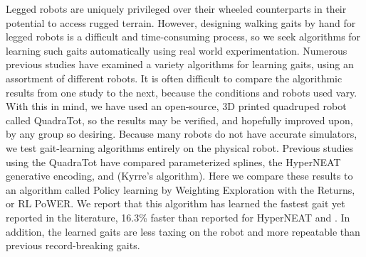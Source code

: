 %

Legged robots are uniquely privileged over their wheeled counterparts
in their potential to access rugged terrain. However, designing
walking gaits by hand for legged robots is a difficult and
time-consuming process, so we seek algorithms for learning such gaits
automatically using real world experimentation. Numerous previous
studies have examined a variety algorithms for learning gaits, using
an assortment of different robots. It is often difficult to compare
the algorithmic results from one study to the next, because the
conditions and robots used vary. With this in mind, we have used an
open-source, 3D printed quadruped robot called QuadraTot, so the results may be
verified, and hopefully improved upon, by any group so
desiring. Because many robots do not have accurate simulators, we test
gait-learning algorithms entirely on the physical robot. Previous
studies using the QuadraTot have compared parameterized splines, the
HyperNEAT generative encoding, and (Kyrre's algorithm). Here we
compare these results to an algorithm called Policy learning by
Weighting Exploration with the Returns, or RL PoWER. We report that
this algorithm has learned the fastest gait yet reported in the
literature, 16.3\% faster  than reported for HyperNEAT and . In addition, the learned gaits are less taxing
on the robot and more repeatable than previous record-breaking gaits.
